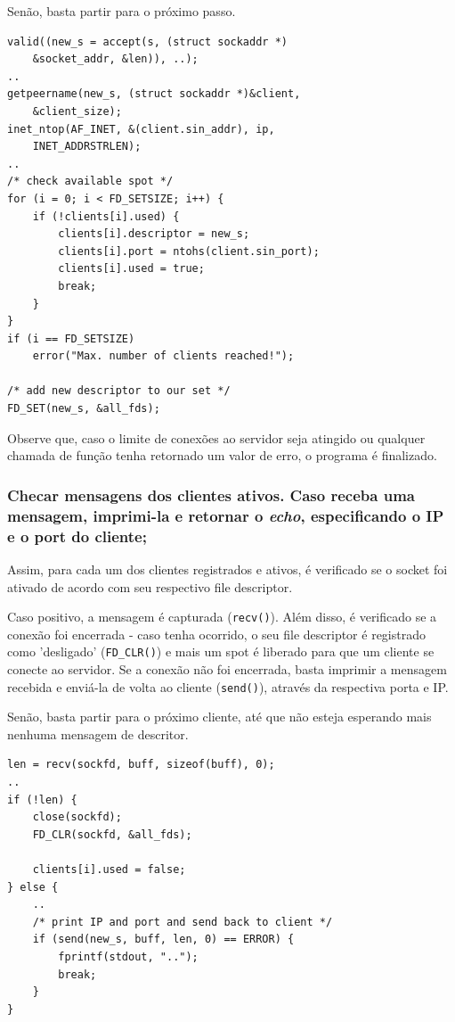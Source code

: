 \documentclass[10pt,twocolumn,letterpaper]{article}
\begin{document}
Senão, basta partir para o próximo passo.

\begin{lstlisting}[caption={Estabelecimento de conexão a um novo cliente}, label=Algorithm]
valid((new_s = accept(s, (struct sockaddr *)
    &socket_addr, &len)), ..);
..
getpeername(new_s, (struct sockaddr *)&client, 
    &client_size);
inet_ntop(AF_INET, &(client.sin_addr), ip, 
    INET_ADDRSTRLEN);
..
/* check available spot */
for (i = 0; i < FD_SETSIZE; i++) {
    if (!clients[i].used) {
        clients[i].descriptor = new_s;
        clients[i].port = ntohs(client.sin_port);
        clients[i].used = true;
        break;
    }
}
if (i == FD_SETSIZE) 
    error("Max. number of clients reached!");

/* add new descriptor to our set */
FD_SET(new_s, &all_fds);
\end{lstlisting}

    Observe que, caso o limite de conexões ao servidor seja atingido ou qualquer chamada de função tenha retornado um valor de erro, o programa é finalizado.

\subsubsection{Checar mensagens dos clientes ativos. Caso receba uma mensagem, imprimi-la e retornar o \textit{echo}, especificando o IP e o port do cliente;}

    Assim, para cada um dos clientes registrados e ativos, é verificado se o socket foi ativado de acordo com seu respectivo file descriptor.

    Caso positivo, a mensagem é capturada (\texttt{recv()}). Além disso, é verificado se a conexão foi encerrada - caso tenha ocorrido, o seu file descriptor é registrado como 'desligado' (\texttt{FD\_CLR()}) e mais um spot é liberado para que um cliente se conecte ao servidor. Se a conexão não foi encerrada, basta imprimir a mensagem recebida e enviá-la de volta ao cliente (\texttt{send()}), através da respectiva porta e IP.

    Senão, basta partir para o próximo cliente, até que não esteja esperando mais nenhuma mensagem de descritor.

    \begin{lstlisting}[caption={Recebimento de mensagens das conexões em aberto}, label=Algorithm]
len = recv(sockfd, buff, sizeof(buff), 0);
..
if (!len) {
    close(sockfd);
    FD_CLR(sockfd, &all_fds);

    clients[i].used = false;
} else {
    ..
    /* print IP and port and send back to client */
    if (send(new_s, buff, len, 0) == ERROR) {
        fprintf(stdout, "..");
        break;
    }
}
    \end{lstlisting}
\end{document}
